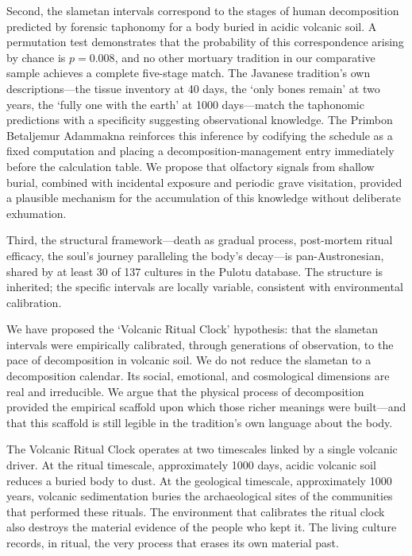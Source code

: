 \documentclass[12pt,a4paper]{article}
\begin{document}
Second, the slametan intervals correspond to the stages of human decomposition predicted by forensic taphonomy for a body buried in acidic volcanic soil. A permutation test demonstrates that the probability of this correspondence arising by chance is $p = 0.008$, and no other mortuary tradition in our comparative sample achieves a complete five-stage match. The Javanese tradition's own descriptions---the tissue inventory at 40 days, the `only bones remain' at two years, the `fully one with the earth' at 1000 days---match the taphonomic predictions with a specificity suggesting observational knowledge. The Primbon Betaljemur Adammakna reinforces this inference by codifying the schedule as a fixed computation and placing a decomposition-management entry immediately before the calculation table. We propose that olfactory signals from shallow burial, combined with incidental exposure and periodic grave visitation, provided a plausible mechanism for the accumulation of this knowledge without deliberate exhumation.

Third, the structural framework---death as gradual process, post-mortem ritual efficacy, the soul's journey paralleling the body's decay---is pan-Austronesian, shared by at least 30 of 137 cultures in the Pulotu database. The structure is inherited; the specific intervals are locally variable, consistent with environmental calibration.

We have proposed the `Volcanic Ritual Clock' hypothesis: that the slametan intervals were empirically calibrated, through generations of observation, to the pace of decomposition in volcanic soil. We do not reduce the slametan to a decomposition calendar. Its social, emotional, and cosmological dimensions are real and irreducible. We argue that the physical process of decomposition provided the empirical scaffold upon which those richer meanings were built---and that this scaffold is still legible in the tradition's own language about the body.

The Volcanic Ritual Clock operates at two timescales linked by a single volcanic driver. At the ritual timescale, approximately 1000 days, acidic volcanic soil reduces a buried body to dust. At the geological timescale, approximately 1000 years, volcanic sedimentation buries the archaeological sites of the communities that performed these rituals. The environment that calibrates the ritual clock also destroys the material evidence of the people who kept it. The living culture records, in ritual, the very process that erases its own material past.
\end{document}

